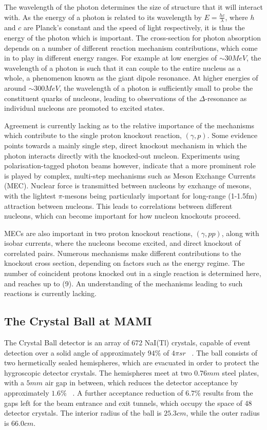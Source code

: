 \documentclass[a4paper,12pt]{article}
\begin{document}
The wavelength of the photon determines the size of structure that it will interact with. As the energy of a photon is related to its wavelength by $E=\frac{hc}{\lambda}$, where $h$ and $c$ are Planck's constant and the speed of light respectively, it is thus the energy of the photon which is important. The cross-section for photon absorption depends on a number of different reaction mechanism contributions, which come in to play in different energy ranges. For example at low energies of $\sim30MeV$, the wavelength of a photon is such that it can couple to the entire nucleus as a whole, a phenomenon known as the giant dipole resonance. At higher energies of around $\sim300MeV$, the wavelength of a photon is sufficiently small to probe the constituent quarks of nucleons, leading to observations of the $\Delta$-resonance as individual nucleons are promoted to excited states.

Agreement is currently lacking as to the relative importance of the mechanisms which contribute to the single proton knockout reaction, $(\gamma,p)$\cite{meucci}{}. Some evidence points towards a mainly single step, direct knockout mechanism in which the photon interacts directly with the knocked-out nucleon\cite{boffi}{}. Experiments using polarisation-tagged photon beams however, indicate that a more prominent role is played by complex, multi-step mechanisms such as Meson Exchange Currents (MEC)\cite{bobeldijk}{}. Nuclear force is transmitted between nucleons by exchange of mesons, with the lightest $\pi$-mesons being particularly important for long-range (1-1.5fm) attraction between nucleons\cite{anwar}{}.
This leads to correlations between different nucleons, which can become important for how nucleon knockouts proceed.

MECs are also important in two proton knockout reactions, $(\gamma,pp)$, along with isobar currents, where the nucleons become excited, and direct knockout of correlated pairs. Numerous mechanisms make different contributions to the knockout cross section, depending on factors such as the energy regime\cite{robinson}{}. The number of coincident protons knocked out in a single reaction is determined here, and reaches up to (9). An understanding of the mechanisms leading to such reactions is currently lacking.

\subsection{The Crystal Ball at MAMI}
The Crystal Ball detector is an array of 672 NaI(Tl) crystals, capable of event detection over a solid angle of approximately $94\%$ of $4\pi sr$ ~\cite{tarbert}{}. The ball consists of two hermetically sealed hemispheres, which are evacuated in order to protect the hygroscopic detector crystals. The hemispheres meet at two $0.76mm$ steel plates, with a $5mm$ air gap in between, which reduces the detector acceptance by approximately $1.6\%$ ~\cite{starostin}{}. A further acceptance reduction of $6.7\%$ results from the gaps left for the beam entrance and exit tunnels, which occupy the space of 48 detector crystals. The interior radius of the ball is $25.3cm$, while the outer radius is $66.0cm$.
\end{document}
